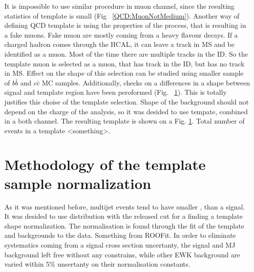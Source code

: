 It is impossible to use similar procedure in muon channel, since the resulting statistics of template is small (Fig ~\ref{QCD:MuonNotMedium}). Another way of defining QCD template is using the properties of the process, that is resulting in a fake muons. Fake muon are mostly coming from a heavy flavour decays. If a charged hadron comes through the HCAL, it can leave a track in MS and be identified as a muon. Most of the time there are multiple tracks in the ID. So the template muon is selected as a muon, that has track in the ID, but has no track in MS. Effect on the shape of this selection can be studied using smaller sample of $b\bar{b}$ and $c\bar{c}$ MC samples. Additionally, checks on a differences in a shape between signal and template region have been peroformed (Fig. ~\ref{}). This is totally justifies this choise of the template selection. Shape of the background should not depend on the charge of the analysis, so it was desided to use tempate, combined in a both channel. The resulting template is shown on a Fig. \ref{}. 
Total number of events in a template <something>.

\section{Methodology of the template sample normalization}
As it was mentioned before, multijet events tend to have smaller \etmiss, than a signal. It was desided to use \etmiss distribution with the released \etmiss cut for a finding a template shape normalization. The normalisation is found through the  fit of the template and backgrounds to the data.
Something from ROOFit. In order to eliminate systematics coming from a signal cross section uncertanty, the signal and MJ background left free without any constrains, while other EWK background are varied within 5\% unsertanty on their normalisation constants. 